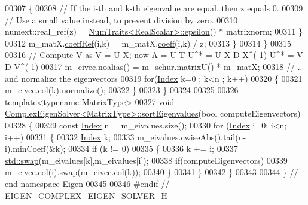 \begin{DoxyCode}
00307       \{
00308         \textcolor{comment}{// If the i-th and k-th eigenvalue are equal, then z equals 0.}
00309         \textcolor{comment}{// Use a small value instead, to prevent division by zero.}
00310         numext::real\_ref(z) = \hyperlink{group___core___module_struct_eigen_1_1_num_traits}{NumTraits<RealScalar>::epsilon}() * matrixnorm;
00311       \}
00312       m\_matX.\hyperlink{class_eigen_1_1_plain_object_base_a25626a55b26a4323565f79d1b7c48ea8}{coeffRef}(i,k) = m\_matX.\hyperlink{class_eigen_1_1_plain_object_base_afbfc12954f16d21aedb7bd839f64a278}{coeff}(i,k) / z;
00313     \}
00314   \}
00315 
00316   \textcolor{comment}{// Compute V as V = U X; now A = U T U^* = U X D X^(-1) U^* = V D V^(-1)}
00317   m\_eivec.noalias() = m\_schur.\hyperlink{group___eigenvalues___module_afed8177cf9836f032d42bdb6c6bc6e01}{matrixU}() * m\_matX;
00318   \textcolor{comment}{// .. and normalize the eigenvectors}
00319   \textcolor{keywordflow}{for}(\hyperlink{group___eigenvalues___module_abc0218d8b902af0d6c759bfc0a8a8d74}{Index} k=0 ; k<n ; k++)
00320   \{
00321     m\_eivec.col(k).normalize();
00322   \}
00323 \}
00324 
00325 
00326 \textcolor{keyword}{template}<\textcolor{keyword}{typename} MatrixType>
00327 \textcolor{keywordtype}{void} \hyperlink{group___eigenvalues___module_class_eigen_1_1_complex_eigen_solver}{ComplexEigenSolver<MatrixType>::sortEigenvalues}(\textcolor{keywordtype}{bool} 
      computeEigenvectors)
00328 \{
00329   \textcolor{keyword}{const} \hyperlink{group___eigenvalues___module_abc0218d8b902af0d6c759bfc0a8a8d74}{Index} n =  m\_eivalues.size();
00330   \textcolor{keywordflow}{for} (\hyperlink{group___eigenvalues___module_abc0218d8b902af0d6c759bfc0a8a8d74}{Index} i=0; i<n; i++)
00331   \{
00332     \hyperlink{group___eigenvalues___module_abc0218d8b902af0d6c759bfc0a8a8d74}{Index} k;
00333     m\_eivalues.cwiseAbs().tail(n-i).minCoeff(&k);
00334     \textcolor{keywordflow}{if} (k != 0)
00335     \{
00336       k += i;
00337       \hyperlink{endian_8c_a3ca5ecd34b04d6a243c054ac3a57f68d}{std::swap}(m\_eivalues[k],m\_eivalues[i]);
00338       \textcolor{keywordflow}{if}(computeEigenvectors)
00339     m\_eivec.col(i).swap(m\_eivec.col(k));
00340     \}
00341   \}
00342 \}
00343 
00344 \} \textcolor{comment}{// end namespace Eigen}
00345 
00346 \textcolor{preprocessor}{#endif // EIGEN\_COMPLEX\_EIGEN\_SOLVER\_H}
\end{DoxyCode}
